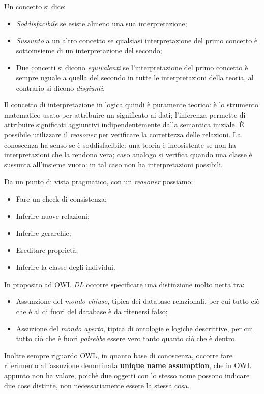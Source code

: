 \documentclass[11pt]{article}
\begin{document}
Un concetto si dice:
\begin{itemize}
\item \textit{Soddisfacibile} se esiste almeno una sua interpretazione; 
\item \textit{Sussunto} a un altro concetto se qualsiasi interpretazione del primo concetto è sottoinsieme di un interpretazione del secondo;
\item Due concetti si dicono \textit{equivalenti} se l'interpretazione del primo concetto è sempre uguale a quella del secondo in tutte le interpretazioni della teoria, al contrario si dicono \textit{disgiunti}.
\end{itemize}
Il concetto di interpretazione in logica quindi è puramente teorico: è lo strumento matematico usato per attribuire un significato ai dati; l'inferenza permette di attribuire significati aggiuntivi indipendentemente dalla semantica iniziale.
È possibile utilizzare il \textit{reasoner} per verificare la correttezza delle relazioni.
La conoscenza ha senso se è soddisfacibile: una teoria è incosistente se non ha interpretazioni che la rendono vera; caso analogo si verifica quando una classe è sussunta all'insieme vuoto: in tal caso non ha interpretazioni possibili.

Da un punto di vista pragmatico, con un \textit{reasoner} possiamo:
\begin{itemize}
\item Fare un check di consistenza;
\item Inferire nuove relazioni;
\item Inferire gerarchie;
\item Ereditare proprietà;
\item Inferire la classe degli individui.
\end{itemize}
In proposito ad OWL \textit{DL} occorre specificare una distinzione molto netta tra:
\begin{itemize}
\item Assunzione del \textit{mondo chiuso}, tipica dei database relazionali, per cui tutto ciò che è al di fuori del database è da ritenersi falso;
\item Assuzione del \textit{mondo aperto}, tipica di ontologie e logiche descrittive, per cui tutto ciò che è fuori \textit{potrebbe} essere vero tanto quanto ciò che è dentro.
\end{itemize}
Inoltre sempre riguardo OWL, in quanto base di conoscenza, occorre fare riferimento all'assuzione denominata \textbf{unique name assumption}, che in OWL appunto non ha valore, poichè due oggetti con lo stesso nome possono indicare due cose distinte, non necessariamente essere la stessa cosa.
\end{document}
